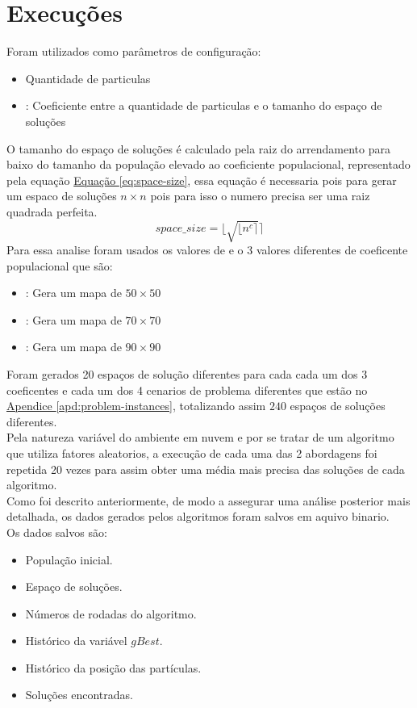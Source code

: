 \section{Execuções}
Foram utilizados como parâmetros de configuração:
\begin{itemize}
    \item {} Quantidade de particulas
    \item {}: Coeficiente entre a quantidade de particulas e o tamanho do espaço de soluções
\end{itemize}
%
O tamanho do espaço de soluções é calculado pela raiz do arrendamento para baixo do tamanho da população elevado ao coeficiente populacional, representado pela equação 
\hyperref[eq:space-size]{Equação \ref{eq:space-size}}, 
essa equação é necessaria pois para gerar um espaco de soluções $n \times n$ pois para isso o numero precisa ser uma raiz quadrada perfeita.
%
\begin{equation} 
    \label{eq:space-size}
    space\_size = \lfloor \sqrt{\lfloor n^c \rceil} \rceil
\end{equation}
%
Para essa analise foram usados os valores de  e o 3 valores diferentes de coeficente populacional que são:
\begin{itemize}
    \item {}: Gera um mapa de $50 \times 50$
    \item {}: Gera um mapa de $70 \times 70$
    \item {}: Gera um mapa de $90 \times 90$
\end{itemize}

Foram gerados 20 espaços de solução diferentes para cada cada um dos 3 coeficentes e cada um dos 4 cenarios de problema diferentes que estão no 
\hyperref[apd:problem-instances]{Apendice \ref{apd:problem-instances}}, totalizando assim $240$ espaços de soluções diferentes.\\
%
Pela natureza variável do ambiente em nuvem e por se tratar de um algoritmo que utiliza fatores aleatorios, a execução de cada uma das 2 abordagens foi repetida 20 vezes para assim obter uma média mais precisa das soluções de cada algoritmo.\\
%
Como foi descrito anteriormente, de modo a assegurar uma análise posterior mais detalhada, os dados gerados pelos algoritmos foram salvos em aquivo binario.\\
Os dados salvos são:
\begin{itemize}
    \item População inicial.
    \item Espaço de soluções.
    \item Números de rodadas do algoritmo.
    \item Histórico da variável $gBest$.
    \item Histórico da posição das partículas.
    \item Soluções encontradas.
\end{itemize}
